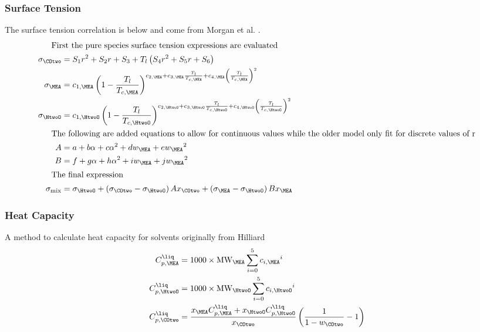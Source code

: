             \subsubsection{Surface Tension} 
            The surface tension correlation is below and come from Morgan et al. \cite{Morgan2015}. 
                \begin{align}
                    \shortintertext{\quad\; First the pure species surface tension expressions are evaluated}
                    \sigma _{\COtwo} &= S_1 r^2+S_2 r+S_3+T_l \left(S_4 r^2+S_5 r+S_6\right) \\
                    \sigma _{\MEA} &= c_{1,\MEA} \left(1-\frac{T_l}{T_{c,\MEA}}\right)^{c_{2,\MEA}+c_{3,\MEA} \frac{T_l}{T_{c,\MEA}}+c_{4,\MEA} \left(\frac{T_l}{T_{c,\MEA}}\right)^2} \\
                    \sigma _{\HtwoO} &= c_{1,\HtwoO} \left(1-\frac{T_l}{T_{c,\HtwoO}}\right)^{c_{2,\HtwoO}+c_{3,\HtwoO} \frac{T_l}{T_{c,\HtwoO}}+c_{4,\HtwoO} \left(\frac{T_l}{T_{c,\HtwoO}}\right)^2} \\
                    \shortintertext{\quad\; The following are added equations to allow for continuous values while the older model only fit for discrete values of r}
                    A &= a+b \alpha+c {\alpha}^2+d w_{\MEA}+e {w_{\MEA}}^2 \\
                    B &= f+g \alpha+h {\alpha}^2+i w_{\MEA}+j {w_{\MEA}}^2 \\
                    \shortintertext{\quad\; The final expression}
                    \sigma _{\text{mix}} &= \sigma_{\HtwoO}+\left(\sigma_{\COtwo}-\sigma_{\HtwoO}\right) A x_{\COtwo}+\left(\sigma_{\MEA}-\sigma_{\HtwoO}\right) B x_{\MEA}
                \end{align}

            \subsubsection{Heat Capacity} 
                A method to calculate heat capacity for solvents originally from Hilliard \cite{Hilliard2008}
                \begin{align}
                    C^{\liq}_{p,\MEA} &= 1000 \times \text{\text{MW}}_{\MEA} \sum_{i=0}^{5} {c_{i, \MEA}}^{i} \\
                    C^{\liq}_{p,\HtwoO} &= 1000 \times \text{\text{MW}}_{\HtwoO} \sum_{i=0}^{5} {c_{i, \HtwoO}}^{i} \\
                    C^{\liq}_{p,\COtwo} &= \frac{x_{\MEA} C^{\liq}_{p,\MEA} + x_{\HtwoO} C^{\liq}_{p,\HtwoO}}{x_{\COtwo}} \left( \frac{1}{1 - w_{\COtwo}} - 1\right)
                \end{align}


